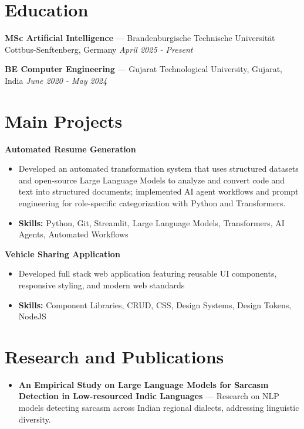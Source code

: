 \documentclass[a4paper,10pt]{article}
\begin{document}
\section*{Education}
\textbf{MSc Artificial Intelligence} — Brandenburgische Technische Universität Cottbus-Senftenberg, Germany \hfill \textit{April 2025 - Present}\par
\vspace{1.5pt}
\textbf{BE Computer Engineering} — Gujarat Technological University, Gujarat, India \hfill \textit{June 2020 - May 2024}\par

\section*{Main Projects}
\textbf{Automated Resume Generation}\par
\vspace{1pt}
\begin{itemize}
  \item Developed an automated transformation system that uses structured datasets and open-source Large Language Models to analyze and convert code and text into structured documents; implemented AI agent workflows and prompt engineering for role-specific categorization with Python and Transformers.
  \item \textbf{Skills:} Python, Git, Streamlit, Large Language Models, Transformers, AI Agents, Automated Workflows
\end{itemize}
\vspace{3pt}
\textbf{Vehicle Sharing Application}\par
\vspace{1pt}
\begin{itemize}
  \item Developed full stack web application featuring reusable UI components, responsive styling, and modern web standards
  \item \textbf{Skills:} Component Libraries, CRUD, CSS, Design Systems, Design Tokens, NodeJS
\end{itemize}

\section*{Research and Publications}
\begin{itemize}
\item \textbf{An Empirical Study on Large Language Models for Sarcasm Detection in Low-resourced Indic Languages} — Research on NLP models detecting sarcasm across Indian regional dialects, addressing linguistic diversity.
\end{itemize}
\end{document}
